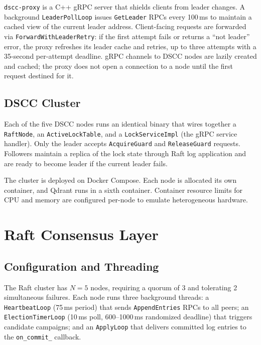 \documentclass[sigconf]{acmart}
\begin{document}
\texttt{dscc-proxy} is a C++ gRPC server that shields clients from leader changes.
A background \texttt{LeaderPollLoop} issues \texttt{GetLeader} RPCs every 100\,ms to
maintain a cached view of the current leader address. Client-facing requests are forwarded
via \texttt{Forward\-With\-Leader\-Retry}: if the first attempt fails or returns a
``not leader'' error, the proxy refreshes its leader cache and retries, up to three
attempts with a 35-second per-attempt deadline. gRPC channels to DSCC nodes are lazily
created and cached; the proxy does not open a connection to a node until the first
request destined for it.

\subsection{DSCC Cluster}

Each of the five DSCC nodes runs an identical binary that wires together a
\texttt{RaftNode}, an \texttt{ActiveLockTable}, and a \texttt{Lock\-Service\-Impl} (the
gRPC service handler). Only the leader accepts \texttt{AcquireGuard} and
\texttt{ReleaseGuard} requests. Followers maintain a replica of the lock state through
Raft log application and are ready to become leader if the current leader fails.

The cluster is deployed on Docker Compose. Each node is allocated its own container, and
Qdrant runs in a sixth container. Container resource limits for CPU and memory are
configured per-node to emulate heterogeneous hardware.

\section{Raft Consensus Layer}
\label{sec:raft}

\subsection{Configuration and Threading}

The Raft cluster has $N{=}5$ nodes, requiring a quorum of 3 and tolerating 2
simultaneous failures. Each node runs three background threads: a \texttt{HeartbeatLoop}
(75\,ms period) that sends \texttt{AppendEntries} RPCs to all peers; an
\texttt{ElectionTimerLoop} (10\,ms poll, 600--1000\,ms randomized deadline) that
triggers candidate campaigns; and an \texttt{ApplyLoop} that delivers committed log
entries to the \texttt{on\_commit\_} callback.
\end{document}
